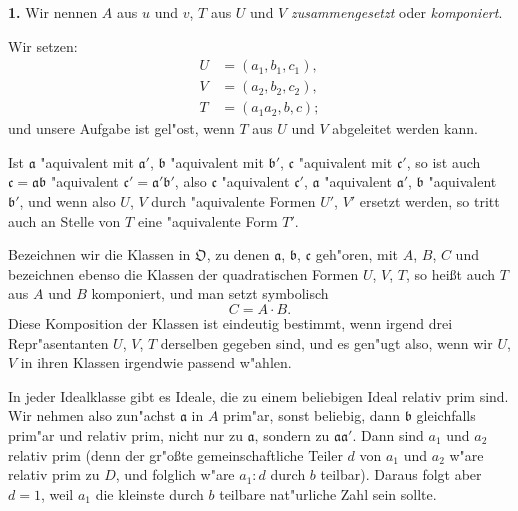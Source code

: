 \documentclass[12pt,a4paper]{article}
\theoremstyle{plain}
\begin{document}
\textbf{1.} Wir nennen $A$ aus $u$ und $v$, $T$ aus $U$ und $V$ \textit{zusammengesetzt} oder \textit{komponiert}.

Wir setzen:
\begin{equation}
\begin{aligned}
U &= (a_1, b_1, c_1),\\
V &= (a_2, b_2, c_2),\\
T &= (a_1 a_2, b, c);
\end{aligned}
\tag{7}
\end{equation}
und unsere Aufgabe ist gel"ost, wenn $T$ aus $U$ und $V$ abgeleitet werden kann.

Ist $\mathfrak{a}$ "aquivalent mit $\mathfrak{a}'$, $\mathfrak{b}$ "aquivalent mit $\mathfrak{b}'$, $\mathfrak{c}$ "aquivalent mit $\mathfrak{c}'$, so ist auch $\mathfrak{c} = \mathfrak{a}\mathfrak{b}$ "aquivalent $\mathfrak{c}' = \mathfrak{a}'\mathfrak{b}'$, also $\mathfrak{c}$ "aquivalent $\mathfrak{c}'$, $\mathfrak{a}$ "aquivalent $\mathfrak{a}'$, $\mathfrak{b}$ "aquivalent $\mathfrak{b}'$, und wenn also $U$, $V$ durch "aquivalente Formen $U'$, $V'$ ersetzt werden, so tritt auch an Stelle von $T$ eine "aquivalente Form $T'$.

Bezeichnen wir die Klassen in $\mathfrak{O}$, zu denen $\mathfrak{a}$, $\mathfrak{b}$, $\mathfrak{c}$ geh"oren, mit $A$, $B$, $C$ und bezeichnen ebenso die Klassen der quadratischen Formen $U$, $V$, $T$, so hei\ss t auch $T$ aus $A$ und $B$ komponiert, und man setzt symbolisch
\begin{equation}
C = A \cdot B.
\tag{8}
\end{equation}
Diese Komposition der Klassen ist eindeutig bestimmt, wenn irgend drei Repr"asentanten $U$, $V$, $T$ derselben gegeben sind, und es gen"ugt also, wenn wir $U$, $V$ in ihren Klassen irgendwie passend w"ahlen.

In jeder Idealklasse gibt es Ideale, die zu einem beliebigen Ideal relativ prim sind. Wir nehmen also zun"achst $\mathfrak{a}$ in $A$ prim"ar, sonst beliebig, dann $\mathfrak{b}$ gleichfalls prim"ar und relativ prim, nicht nur zu $\mathfrak{a}$, sondern zu $\mathfrak{a}\mathfrak{a}'$. Dann sind $a_1$ und $a_2$ relativ prim (denn der gr"o\ss te gemeinschaftliche Teiler $d$ von $a_1$ und $a_2$ w"are relativ prim zu $D$, und folglich w"are $a_1:d$ durch $b$ teilbar). Daraus folgt aber $d = 1$, weil $a_1$ die kleinste durch $b$ teilbare nat"urliche Zahl sein sollte.
\end{document}
